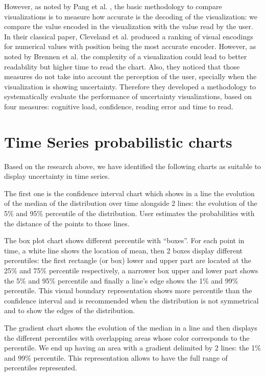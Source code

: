 \documentclass[a4paper,3p,sort&compress]{elsarticle}
\begin{document}
However, as noted by Pang et al. \cite{pang_approaches_1997}, the basic methodology to compare visualizations is to measure how accurate is the 
decoding of the visualization: we compare the value encoded in the visualization with the value read
by the user. In their classical paper, Cleveland et al. \cite{cleveland_graphical_1984} produced a ranking of visual encodings for numerical values 
with position being the most accurate encoder. However, as noted by Brennen et al. \cite{brennen_instrument_2018}
the complexity of a visualization could lead to better readability but higher time to read the chart. Also, 
they noticed that those measures do not take into account the perception of the user, specially when the visualization
is showing uncertainty. Therefore they developed a methodology 
to systematically evaluate the performance of uncertainty visualizations, based on four measures: 
cognitive load, confidence, reading error and time to read. 

\section{Time Series probabilistic charts}  
\label{sec:time_series}

Based on the research above, we have identified the following charts as suitable to display 
uncertainty in time series.

The first one is the confidence interval chart  which shows in a line the evolution of the 
median of the distribution
 over time alongside 2 lines: the evolution of the 5\% and 95\% percentile of the distribution. 
 User estimates the probabilities with the distance of the points to those lines.

The box plot chart shows different percentile with “boxes”. For each point in time, a white 
line shows the location of mean, then 2 boxes display different percentiles: the
first rectangle (or box) lower and upper part are located 
at the 25\% and 75\% percentile respectively, a narrower box upper and lower part shows 
the 5\% and 95\% percentile and finally a line’s edge shows the 1\% and 99\% percentile. 
This visual boundary representation shows more percentile than the confidence interval and 
is recommended when the distribution is not symmetrical and to show the edges of the distribution.

The gradient chart shows the evolution of the median in a line and then displays the different percentiles
with overlapping areas whose color corresponds to the percentile. We end up having an area with a gradient 
delimited by 2 lines: the 1\% and 99\% percentile. This representation allows to have the
 full range of percentiles represented.
\end{document}
